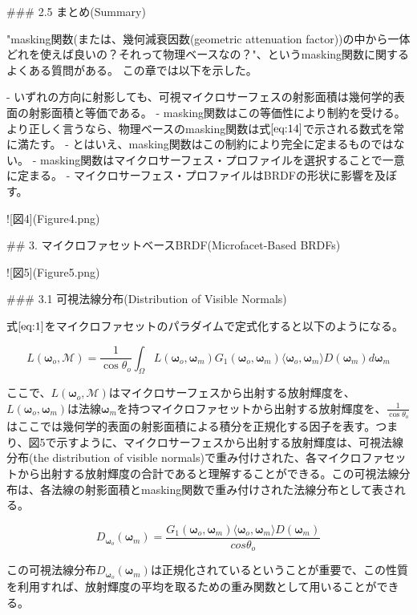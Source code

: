 ### 2.5 まとめ(Summary)

"masking関数(または、幾何減衰因数(geometric attenuation factor))の中から一体どれを使えば良いの？それって物理ベースなの？"、というmasking関数に関するよくある質問がある。
この章では以下を示した。

- いずれの方向に射影しても、可視マイクロサーフェスの射影面積は幾何学的表面の射影面積と等価である。
- masking関数はこの等価性により制約を受ける。より正しく言うなら、物理ベースのmasking関数は式$\eqref{eq:14}$で示される数式を常に満たす。
- とはいえ、masking関数はこの制約により完全に定まるものではない。
- masking関数はマイクロサーフェス・プロファイルを選択することで一意に定まる。
- マイクロサーフェス・プロファイルはBRDFの形状に影響を及ぼす。

![図4](Figure4.png)

## 3. マイクロファセットベースBRDF(Microfacet-Based BRDFs)

![図5](Figure5.png)

### 3.1 可視法線分布(Distribution of Visible Normals)

式$\eqref{eq:1}$をマイクロファセットのパラダイムで定式化すると以下のようになる。

\[
L(\boldsymbol{\omega}_o, \mathcal{M}) = \frac{1}{\cos\theta_o} \int_\Omega L(\boldsymbol{\omega}_o, \boldsymbol{\omega}_m) G_1(\boldsymbol{\omega}_o, \boldsymbol{\omega}_m) \langle \boldsymbol{\omega}_o, \boldsymbol{\omega}_m \rangle D(\boldsymbol{\omega}_m) d\boldsymbol{\omega}_m
\label{eq:15} \tag{15}
\]

ここで、$L(\boldsymbol{\omega}_o, \mathcal{M})$はマイクロサーフェスから出射する放射輝度を、$L(\boldsymbol{\omega}_o, \boldsymbol{\omega}_m)$は法線$\boldsymbol{\omega}_m$を持つマイクロファセットから出射する放射輝度を、$\frac{1}{\cos\theta_o}$はここでは幾何学的表面の射影面積による積分を正規化する因子を表す。つまり、図5で示すように、マイクロサーフェスから出射する放射輝度は、可視法線分布(the distribution of visible normals)で重み付けされた、各マイクロファセットから出射する放射輝度の合計であると理解することができる。この可視法線分布は、各法線の射影面積とmasking関数で重み付けされた法線分布として表される。

\[
D_{\boldsymbol{\omega}_o}(\boldsymbol{\omega}_m) = \frac{G_1(\boldsymbol{\omega}_o, \boldsymbol{\omega}_m) \langle \boldsymbol{\omega}_o, \boldsymbol{\omega}_m \rangle D(\boldsymbol{\omega}_m)}{cos\theta_o}
\label{eq:16} \tag{16}
\]

この可視法線分布$D_{\boldsymbol{\omega}_o}(\boldsymbol{\omega}_m)$は正規化されているということが重要で、この性質を利用すれば、放射輝度の平均を取るための重み関数として用いることができる。

